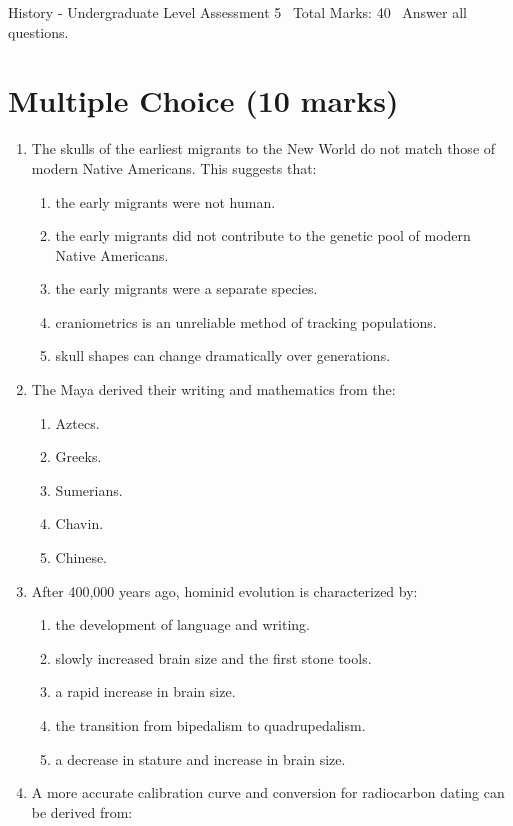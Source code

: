 \documentclass[12pt]{article}
\begin{document}
\begin{center}
History - Undergraduate Level Assessment 5 \
Total Marks: 40 \
Answer all questions.
\end{center}

\section*{Multiple Choice (10 marks)}
\begin{enumerate}[label=\arabic*.]
\item The skulls of the earliest migrants to the New World do not match those of modern Native Americans. This suggests that:
\begin{enumerate}[label=(\alph*)]
    \item the early migrants were not human.
    \item the early migrants did not contribute to the genetic pool of modern Native Americans.
    \item the early migrants were a separate species.
    \item craniometrics is an unreliable method of tracking populations.
    \item skull shapes can change dramatically over generations.
\end{enumerate}
\item The Maya derived their writing and mathematics from the:
\begin{enumerate}[label=(\alph*)]
    \item Aztecs.
    \item Greeks.
    \item Sumerians.
    \item Chavin.
    \item Chinese.
\end{enumerate}
\item After 400,000 years ago, hominid evolution is characterized by:
\begin{enumerate}[label=(\alph*)]
    \item the development of language and writing.
    \item slowly increased brain size and the first stone tools.
    \item a rapid increase in brain size.
    \item the transition from bipedalism to quadrupedalism.
    \item a decrease in stature and increase in brain size.
\end{enumerate}
\item A more accurate calibration curve and conversion for radiocarbon dating can be derived from:

\end{enumerate}
\end{document}
